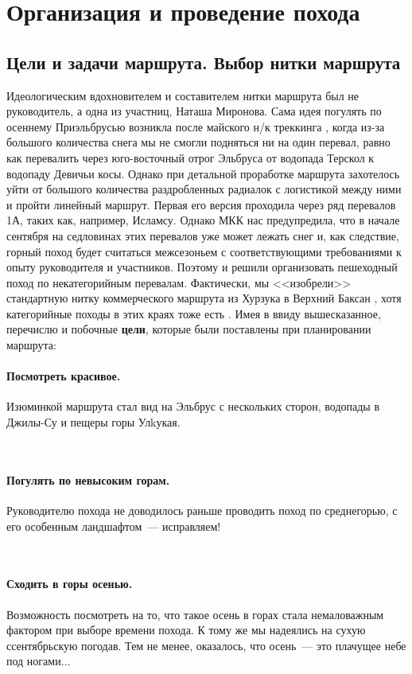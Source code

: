 \section{Организация и проведение похода}
\subsection{Цели и задачи маршрута. Выбор нитки маршрута}
Идеологическим вдохновителем и составителем нитки маршрута был не руководитель, а одна из участниц, Наташа Миронова. Сама идея погулять по осеннему Приэльбрусью возникла после майского н/к треккинга \cite{ostapiv2025}, когда из-за большого количества снега мы не смогли подняться ни на один перевал, равно как перевалить через юго-восточный отрог Эльбруса от водопада Терскол к водопаду Девичьи косы. Однако при детальной проработке маршрута захотелось уйти от большого количества раздробленных радиалок с логистикой между ними и пройти линейный маршрут. Первая его версия проходила через ряд перевалов 1А, таких как, например, Исламсу. Однако МКК нас предупредила, что в начале сентября на седловинах этих перевалов уже может лежать снег и, как следствие, горный поход будет считаться межсезоньем с соответствующими требованиями к опыту руководителя и участников. Поэтому и решили организовать пешеходный поход по некатегорийным перевалам. Фактически, мы <<изобрели>> стандартную нитку коммерческого маршрута из Хурзука в Верхний Баксан \cite{kommersy}, хотя категорийные походы в этих краях тоже есть \cite{elbrus2022sevlova}. Имея в ввиду вышесказанное, перечислю и побочные \textbf{цели}, которые были поставлены при планировании маршрута:

\paragraph{﻿﻿Посмотреть красивое.} Изюминкой маршрута стал вид на Эльбрус с нескольких сторон, водопады в Джилы-Су и пещеры горы Улkукая.

﻿﻿\paragraph{﻿﻿Погулять по невысоким горам.} Руководителю похода не доводилось раньше проводить поход по среднегорью, с его особенным ландшафтом~--- исправляем!
	
	
﻿﻿\paragraph{﻿﻿Сходить в горы осенью.} Возможность посмотреть на то, что такое осень в горах стала немаловажным фактором при выборе времени похода. К тому же мы надеялись на сухую ссентябрьскую погодав. Тем не менее, оказалось, что осень~--- это плачущее небе под ногами$\ldots$

